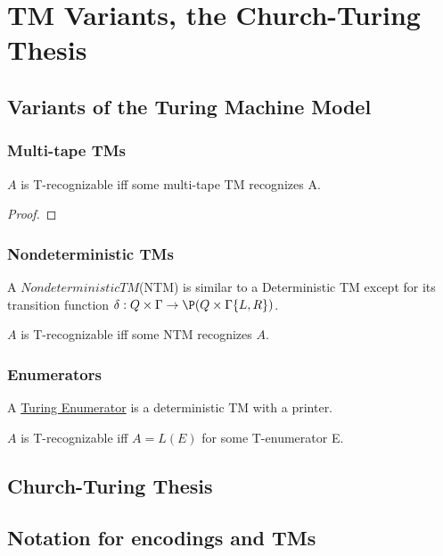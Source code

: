 \chapter{TM Variants, the Church-Turing Thesis}

\section{Variants of the Turing Machine Model}

\subsection{Multi-tape TMs}
\begin{theorem}
    \(A\) is T-recognizable iff some multi-tape TM recognizes A.
\end{theorem}
\begin{proof}
    
\end{proof}


\subsection{Nondeterministic TMs}

A \(Nondeterministic TM\)(NTM) is similar to a Deterministic TM except for its transition function \(\delta: Q \times \Gamma \rightarrow \P(Q \times \Gamma \{ L, R \} )\).

\begin{theorem}
    \(A\) is T-recognizable iff some NTM recognizes \(A\).  
\end{theorem}

\subsection{Enumerators}

\begin{definition}
    A \underline{Turing Enumerator} is a deterministic TM with a printer.
\end{definition}

\begin{theorem}
    \(A\) is T-recognizable iff \(A = L(E)\) for some T-enumerator E. 
\end{theorem}

\section{Church-Turing Thesis}


\section{Notation for encodings and TMs}